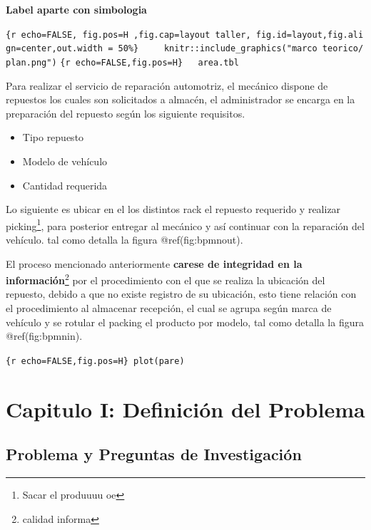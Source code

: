 \documentclass[11pt]{article}
\providecommand{\tightlist}{%
      \setlength{\itemsep}{0pt}\setlength{\parskip}{0pt}}
\begin{document}
\textbf{Label aparte con simbologia}

\texttt{\{r\ echo=FALSE,\ fig.pos=\textquotesingle{}H\textquotesingle{}\ ,fig.cap=\textquotesingle{}layout\ taller\textquotesingle{},\ fig.id=\textquotesingle{}layout\textquotesingle{},fig.align=\textquotesingle{}center\textquotesingle{},out.width\ =\ \textquotesingle{}50\%\textquotesingle{}\}\ \ \ \ \ knitr::include\_graphics("marco\ teorico/plan.png")}
\texttt{\{r\ echo=FALSE,fig.pos=\textquotesingle{}H\textquotesingle{}\}\ \ \ area.tbl}

Para realizar el servicio de reparación automotriz, el mecánico dispone
de repuestos los cuales son solicitados a almacén, el administrador se
encarga en la preparación del repuesto según los siguiente requisitos.

\begin{itemize}
\tightlist
\item
  Tipo repuesto
\item
  Modelo de vehículo
\item
  Cantidad requerida
\end{itemize}

Lo siguiente es ubicar en el los distintos rack el repuesto requerido y
realizar picking\footnote{Sacar el produuuu oe}, para posterior entregar
al mecánico y así continuar con la reparación del vehículo. tal como
detalla la figura @ref(fig:bpmnout).

El proceso mencionado anteriormente \textbf{carese de integridad en la
información}\footnote{calidad informa} por el procedimiento con el que
se realiza la ubicación del repuesto, debido a que no existe registro de
su ubicación, esto tiene relación con el procedimiento al almacenar
recepción, el cual se agrupa según marca de vehículo y se rotular el
packing el producto por modelo, tal como detalla la figura
@ref(fig:bpmnin).

\texttt{\{r\ echo=FALSE,fig.pos=\textquotesingle{}H\textquotesingle{}\}\ plot(pare)}

\hypertarget{capitulo-i-definiciuxf3n-del-problema}{%
\section{Capitulo I: Definición del
Problema}\label{capitulo-i-definiciuxf3n-del-problema}}

\hypertarget{problema-y-preguntas-de-investigaciuxf3n}{%
\subsection{Problema y Preguntas de
Investigación}\label{problema-y-preguntas-de-investigaciuxf3n}}
\end{document}
